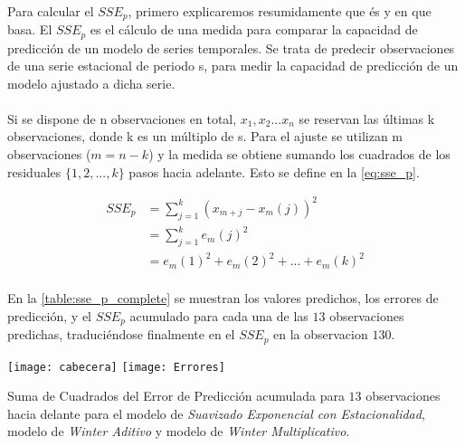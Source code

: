 \documentclass[a4paper, spanish]{article}
\begin{document}
    \paragraph{}
    Para calcular el $SSE_p$, primero explicaremos resumidamente que és y en que basa. El $SSE_p$ es el cálculo de una medida para comparar la capacidad de predicción de un modelo de series temporales.
    Se trata de predecir observaciones de una serie estacional de periodo s, para
    medir la capacidad de predicción de un modelo ajustado a dicha serie.

    \paragraph{}
    Si se dispone de n observaciones en total, $x_1,x_2...x_n$ se reservan las últimas k observaciones, donde k es un múltiplo de s. Para el ajuste se utilizan m observaciones ($m = n - k$) y la medida se obtiene sumando los cuadrados de los residuales $\{1, 2, ..., k\}$ pasos hacia adelante. Esto se define en la \autoref{eq:sse_p}.

    \begin{equation}
    \label{eq:sse_p}
      \begin{split}
        SSE_p
        &= \sum_{j = 1} ^ k (x_{m + j} - x_{m}(j)) ^ 2 \\
        &= \sum_{j = 1} ^ k e_m(j) ^ 2 \\
        &= e_m(1) ^ 2 + e_m(2) ^ 2 + ... + e_m(k) ^ 2
      \end{split}
    \end{equation}

    \paragraph{}
    En la \autoref{table:sse_p_complete} se muestran los valores predichos, los errores de predicción, y el $SSE_p$ acumulado para cada una de las $13$ observaciones predichas, traduciéndose finalmente en el $SSE_p$ en la observacion $130$.

    \begin{table}[htb!]
      \centering
      \texttt{[image: cabecera]}
      \texttt{[image: Errores]}
      \caption{Suma de Cuadrados del Error de Predicción acumulada para $13$ observaciones hacia delante para el modelo de \emph{Suavizado Exponencial con Estacionalidad}, modelo de \emph{Winter Aditivo} y modelo de \emph{Winter Multiplicativo}.}
      \label{table:sse_p_complete}
    \end{table}
\end{document}
